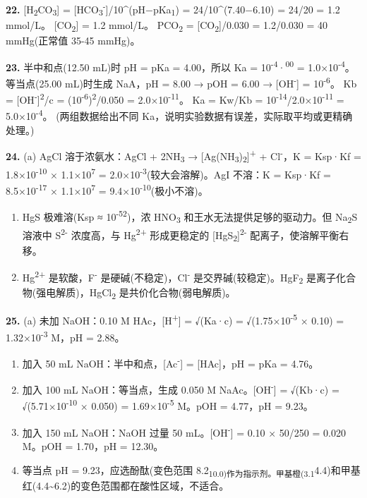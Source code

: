 \documentclass[a4paper,11pt]{ctexart}
\begin{document}
\textbf{22.} {[}H\textsubscript{2}CO\textsubscript{3}{]} = {[}HCO\textsubscript{3}\textsuperscript{-}{]}/10\^{}(pH−pKa\textsubscript{1}) = 24/10\^{}(7.40−6.10) = 24/20 = 1.2 mmol/L。
{[}CO\textsubscript{2}{]} = 1.2 mmol/L。
PCO\textsubscript{2} = {[}CO\textsubscript{2}{]}/0.030 = 1.2/0.030 = 40 mmHg(正常值 35-45 mmHg)。

\textbf{23.} 半中和点(12.50 mL)时 pH = pKa = 4.00，所以 Ka = 10\textsuperscript{-4}·\textsuperscript{00} = 1.0×10\textsuperscript{-4}。
等当点(25.00 mL)时生成 NaA，pH = 8.00 → pOH = 6.00 → {[}OH\textsuperscript{-}{]} = 10\textsuperscript{-6}。
Kb = {[}OH\textsuperscript{-}{]}\textsuperscript{2}/c = (10\textsuperscript{-6})\textsuperscript{2}/0.050 = 2.0×10\textsuperscript{-11}。
Ka = Kw/Kb = 10\textsuperscript{-14}/2.0×10\textsuperscript{-11} = 5.0×10\textsuperscript{-4}。
(两组数据给出不同 Ka，说明实验数据有误差，实际取平均或更精确处理。)

\textbf{24.}
(a) AgCl 溶于浓氨水：AgCl + 2NH\textsubscript{3} → {[}Ag(NH\textsubscript{3})\textsubscript{2}{]}\textsuperscript{+} + Cl\textsuperscript{-}，K = Ksp·Kf = 1.8×10\textsuperscript{-10} × 1.1×10\textsuperscript{7} = 2.0×10\textsuperscript{-3}(较大会溶解)。AgI 不溶：K = Ksp·Kf = 8.5×10\textsuperscript{-17} × 1.1×10\textsuperscript{7} = 9.4×10\textsuperscript{-10}(极小不溶)。

\begin{enumerate}
\def\labelenumi{(\alph{enumi})}
\setcounter{enumi}{1}
\item
  HgS 极难溶(Ksp ≈ 10\textsuperscript{-52})，浓 HNO\textsubscript{3} 和王水无法提供足够的驱动力。但 Na\textsubscript{2}S 溶液中 S\textsuperscript{2-} 浓度高，与 Hg\textsuperscript{2+} 形成更稳定的 {[}HgS\textsubscript{2}{]}\textsuperscript{2-} 配离子，使溶解平衡右移。
\item
  Hg\textsuperscript{2+} 是软酸，F\textsuperscript{-} 是硬碱(不稳定)，Cl\textsuperscript{-} 是交界碱(较稳定)。HgF\textsubscript{2} 是离子化合物(强电解质)，HgCl\textsubscript{2} 是共价化合物(弱电解质)。
\end{enumerate}

\textbf{25.}
(a) 未加 NaOH：0.10 M HAc，{[}H\textsuperscript{+}{]} = √(Ka·c) = √(1.75×10\textsuperscript{-5} × 0.10) = 1.32×10\textsuperscript{-3} M，pH = 2.88。

\begin{enumerate}
\def\labelenumi{(\alph{enumi})}
\setcounter{enumi}{1}
\item
  加入 50 mL NaOH：半中和点，{[}Ac\textsuperscript{-}{]} = {[}HAc{]}，pH = pKa = 4.76。
\item
  加入 100 mL NaOH：等当点，生成 0.050 M NaAc。{[}OH\textsuperscript{-}{]} = √(Kb·c) = √(5.71×10\textsuperscript{-10} × 0.050) = 1.69×10\textsuperscript{-5} M。pOH = 4.77，pH = 9.23。
\item
  加入 150 mL NaOH：NaOH 过量 50 mL。{[}OH\textsuperscript{-}{]} = 0.10 × 50/250 = 0.020 M。pOH = 1.70，pH = 12.30。
\item
  等当点 pH = 9.23，应选酚酞(变色范围 8.2\textsubscript{10.0)作为指示剂。甲基橙(3.1}4.4)和甲基红(4.4\textasciitilde6.2)的变色范围都在酸性区域，不适合。
\end{enumerate}
\end{document}

